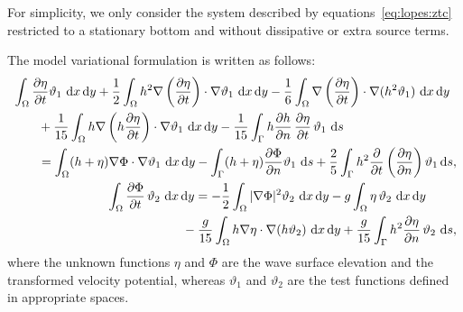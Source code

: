 For simplicity, we only consider the system described by
equations~\eqref{eq:lopes:ztc} restricted to a stationary bottom and
without dissipative or extra source terms.

The model variational formulation is written as follows:
\begin{subequations}
  \label{eq:lopes:varform}
  \begin{align}
    \begin{split}
      &\displaystyle \int_\Omega\frac{\partial \eta}{\partial
        t}\vartheta_1\, \, \mathrm{d}x\, \mathrm{d}y +\frac{1}{2}\int_\Omega
      h^2\nabla\left(\frac{\partial \eta}{\partial t}\right)
      \cdot\nabla\vartheta_1\, \, \mathrm{d}x\, \mathrm{d}y-
      \frac{1}{6}\int_\Omega \nabla\left(\frac{\partial \eta}{\partial
          t}\right)\cdot\nabla(h^2\vartheta_1)\, \, \mathrm{d}x\, \mathrm{d}y\\
      &\quad \quad\displaystyle +
      \frac{1}{15}\int_\Omega
      h\nabla\left(h\frac{\partial \eta}{\partial t}\right)\cdot
      \nabla\vartheta_1\, \, \mathrm{d}x\, \mathrm{d}y- \frac{1}{15}\int_\Gamma
      h\frac{\partial h}{\partial n}\,\frac{\partial \eta}{\partial
        t}\,\vartheta_1\, \, \mathrm{d}s
      \\ &\quad\quad=\displaystyle
      \int_\Omega(h+\eta)\nabla\Phi\cdot\nabla\vartheta_1\,
      \, \mathrm{d}x\, \mathrm{d}y -\int_\Gamma(h+\eta)\frac{\partial
        \Phi}{\partial n}\vartheta_1\, \, \mathrm{d}s
      +\frac{2}{5}\int_\Gamma
      h^2\frac{\partial }{\partial t}\left(\frac{\partial
          \eta}{\partial n}\right)\vartheta_1 \, \mathrm{d}s,
    \end{split} \\
    \begin{split}
      &\displaystyle \int_\Omega \frac{\partial \Phi}{\partial
        t}\,\vartheta_2\, \, \mathrm{d}x\, \mathrm{d}y=
      -\frac{1}{2}\int_\Omega|\nabla\Phi|^2\vartheta_2\, \, \mathrm{d}x\,
      \mathrm{d}y -g\int_\Omega \eta\,\vartheta_2\, \, \mathrm{d}x\,
      \mathrm{d}y\\
      &\qquad\qquad\qquad\displaystyle-\frac{g}{15}\int_\Omega
      h\nabla\eta\cdot\nabla(h\vartheta_2)\, \, \mathrm{d}x\, \mathrm{d}y
      +\frac{g}{15}\int_\Gamma h^2\frac{\partial \eta}{\partial
        n}\,\vartheta_2\, \, \mathrm{d}s,
    \end{split}
  \end{align}
\end{subequations}
where the unknown functions $\eta$ and $\Phi$ are the wave surface
elevation and the transformed velocity potential, whereas
$\vartheta_1$ and $\vartheta_2$ are the test functions defined in
appropriate spaces.

